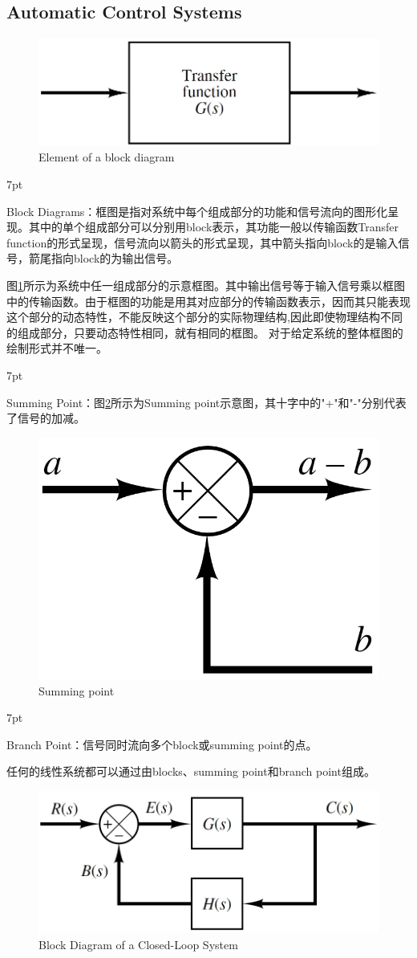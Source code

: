\documentclass{article}
\numberwithin{equation}{section}
\numberwithin{figure}{section}
\newenvironment{formal}{%
\def\FrameCommand{%
\hspace{1pt}%
{\color{DarkBlue}\vrule width 2pt}%
{\color{formalshade}\vrule width 4pt}%
\colorbox{formalshade}%
}%
\MakeFramed{\advance\hsize-\width\FrameRestore}%
\noindent\hspace{-4.55pt}%
\begin{adjustwidth}{}{7pt}%
\vspace{2pt}\vspace{2pt}%
}
{%
\vspace{2pt}\end{adjustwidth}\endMakeFramed%
}
\begin{document}
\subsection{Automatic Control Systems}

\begin{figure}
    \centering
    \includegraphics[width=.4\textwidth]{Chapter2/block diagram.png} %
    \caption{Element of a block diagram} %
    \label{blockdiagram} %
\end{figure}
\begin{formal}
    Block Diagrams：框图是指对系统中每个组成部分的功能和信号流向的图形化呈现。其中的单个组成部分可以分别用block表示，其功能一般以传输函数Transfer function的形式呈现，信号流向以箭头的形式呈现，其中箭头指向block的是输入信号，箭尾指向block的为输出信号。
\end{formal}
图\ref{blockdiagram}所示为系统中任一组成部分的示意框图。其中输出信号等于输入信号乘以框图中的传输函数。由于框图的功能是用其对应部分的传输函数表示，因而其只能表现这个部分的动态特性，不能反映这个部分的实际物理结构,因此即使物理结构不同的组成部分，只要动态特性相同，就有相同的框图。
对于给定系统的整体框图的绘制形式并不唯一。
\begin{formal}
    Summing Point：图\ref{Summingpoint}所示为Summing point示意图，其十字中的"+"和"-"分别代表了信号的加减。
\end{formal}
\begin{figure}
    \centering
    \includegraphics[width=.2\textwidth]{Chapter2/summingpoint.png} %
    \caption{Summing point} %
    \label{Summingpoint} %
\end{figure}
\begin{formal}
    Branch Point：信号同时流向多个block或summing point的点。
\end{formal}
任何的线性系统都可以通过由blocks、summing point和branch point组成。
\begin{figure}
    \centering
    \includegraphics[width=.4\textwidth]{Chapter2/feedback system block.png} %
    \caption{Block Diagram of a Closed-Loop System} %
    \label{BlockDiagramofaClosed-LoopSystem} %
\end{figure}
\end{document}
